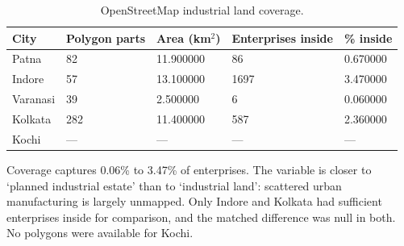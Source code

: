 \begin{table}[htbp]
\centering
\small
\caption{OpenStreetMap industrial land coverage.}
\label{tab:s9a_estate_coverage}
\begin{tabular}{lllll}
\toprule
City & Polygon parts & Area (km$^2$) & Enterprises inside & \% inside \\
\midrule
Patna & 82 & 11.900000 & 86 & 0.670000 \\
Indore & 57 & 13.100000 & 1697 & 3.470000 \\
Varanasi & 39 & 2.500000 & 6 & 0.060000 \\
Kolkata & 282 & 11.400000 & 587 & 2.360000 \\
Kochi & — & — & — & — \\
\bottomrule
\end{tabular}
\begin{tablenotes}\footnotesize
\item Coverage captures 0.06\% to 3.47\% of enterprises. The variable is closer to `planned industrial estate' than to `industrial land': scattered urban manufacturing is largely unmapped. Only Indore and Kolkata had sufficient enterprises inside for comparison, and the matched difference was null in both. No polygons were available for Kochi.
\end{tablenotes}
\end{table}

